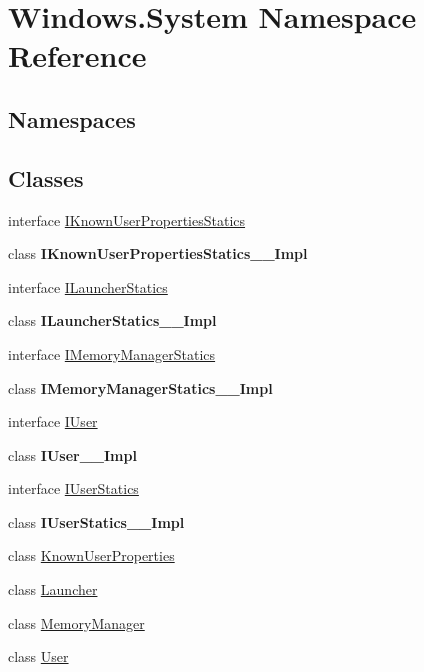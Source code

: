 \hypertarget{namespace_windows_1_1_system}{}\section{Windows.\+System Namespace Reference}
\label{namespace_windows_1_1_system}
\subsection*{Namespaces}
\begin{DoxyCompactItemize}
\end{DoxyCompactItemize}
\subsection*{Classes}
\begin{DoxyCompactItemize}
\item 
interface \hyperlink{interface_windows_1_1_system_1_1_i_known_user_properties_statics}{I\+Known\+User\+Properties\+Statics}
\item 
class {\bfseries I\+Known\+User\+Properties\+Statics\+\_\+\+\_\+\+Impl}
\item 
interface \hyperlink{interface_windows_1_1_system_1_1_i_launcher_statics}{I\+Launcher\+Statics}
\item 
class {\bfseries I\+Launcher\+Statics\+\_\+\+\_\+\+Impl}
\item 
interface \hyperlink{interface_windows_1_1_system_1_1_i_memory_manager_statics}{I\+Memory\+Manager\+Statics}
\item 
class {\bfseries I\+Memory\+Manager\+Statics\+\_\+\+\_\+\+Impl}
\item 
interface \hyperlink{interface_windows_1_1_system_1_1_i_user}{I\+User}
\item 
class {\bfseries I\+User\+\_\+\+\_\+\+Impl}
\item 
interface \hyperlink{interface_windows_1_1_system_1_1_i_user_statics}{I\+User\+Statics}
\item 
class {\bfseries I\+User\+Statics\+\_\+\+\_\+\+Impl}
\item 
class \hyperlink{class_windows_1_1_system_1_1_known_user_properties}{Known\+User\+Properties}
\item 
class \hyperlink{class_windows_1_1_system_1_1_launcher}{Launcher}
\item 
class \hyperlink{class_windows_1_1_system_1_1_memory_manager}{Memory\+Manager}
\item 
class \hyperlink{class_windows_1_1_system_1_1_user}{User}
\end{DoxyCompactItemize}
